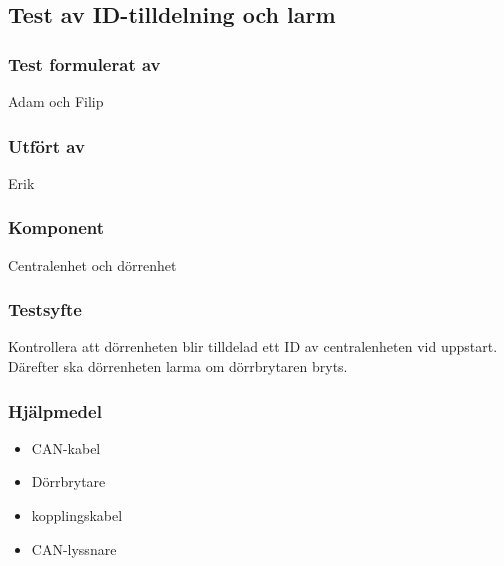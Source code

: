 \clearpage
\subsection{Test av ID-tilldelning och larm}
\label{test:idLarm}

\setlength{\columnsep}{1cm}




\begin{multicols}{2}
\subsubsection*{Test formulerat av}
Adam och Filip

\subsubsection*{Utfört av}
Erik


\end{multicols}
\subsubsection*{Komponent}
Centralenhet och dörrenhet



\subsubsection*{Testsyfte}
Kontrollera att dörrenheten blir tilldelad ett ID av centralenheten vid uppstart. Därefter ska dörrenheten larma om dörrbrytaren bryts.


\subsubsection*{Hjälpmedel}
\begin{itemize}
	\item CAN-kabel
	\item Dörrbrytare
	\item kopplingskabel
	\item CAN-lyssnare
\end{itemize}



